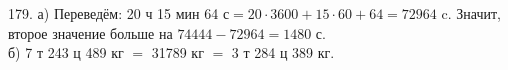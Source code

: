 179. а) Переведём: 20 ч 15 мин 64 с$=20\cdot3600+15\cdot60+64=72964$ c. Значит, второе значение больше на $74444-72964=1480$ с.\\
б) 7 т 243 ц 489 кг $=$ 31789 кг $=$ 3 т 284 ц 389 кг.\\
